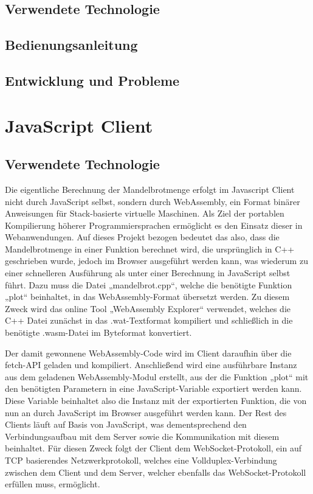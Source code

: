 \documentclass[12pt, onecolumn, notitlepage]{scrartcl}
\begin{document}
\subsection{Verwendete Technologie}
\subsection{Bedienungsanleitung}
\subsection{Entwicklung und Probleme}

\section{JavaScript Client}
\subsection{Verwendete Technologie}
Die eigentliche Berechnung der Mandelbrotmenge erfolgt im Javascript Client nicht durch JavaScript selbst, sondern durch WebAssembly, ein Format binärer Anweisungen für Stack-basierte virtuelle Maschinen. Als Ziel der portablen Kompilierung höherer Programmiersprachen ermöglicht es den Einsatz dieser in Webanwendungen. Auf dieses Projekt bezogen bedeutet das also, dass die Mandelbrotmenge in einer Funktion berechnet wird, die ursprünglich in C++ geschrieben wurde, jedoch im Browser ausgeführt werden kann, was wiederum zu einer schnelleren Ausführung als unter einer Berechnung in JavaScript selbst führt. Dazu muss die Datei „mandelbrot.cpp“, welche die benötigte Funktion „plot“ beinhaltet, in das WebAssembly-Format übersetzt werden. Zu diesem Zweck wird das online Tool „WebAssembly Explorer“ verwendet, welches die C++ Datei zunächst in das .wat-Textformat kompiliert und schließlich in die benötigte .wasm-Datei im Byteformat konvertiert. \par
Der damit gewonnene WebAssembly-Code wird im Client daraufhin über die fetch-API geladen und kompiliert. Anschließend wird eine ausführbare Instanz aus dem geladenen WebAssembly-Modul erstellt, aus der die Funktion „plot“ mit den benötigten Parametern in eine JavaScript-Variable exportiert werden kann. Diese Variable beinhaltet also die Instanz mit der exportierten Funktion, die von nun an durch JavaScript im Browser ausgeführt werden kann.
Der Rest des Clients läuft auf Basis von JavaScript, was dementsprechend den Verbindungsaufbau mit dem Server sowie die Kommunikation mit diesem beinhaltet. Für diesen Zweck folgt der Client dem WebSocket-Protokoll, ein auf TCP basierendes Netzwerkprotokoll, welches eine Vollduplex-Verbindung zwischen dem Client und dem Server, welcher ebenfalls das WebSocket-Protokoll erfüllen muss, ermöglicht. \par
\end{document}
